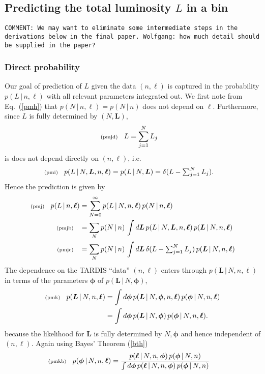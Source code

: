 \documentclass[11pt]{article}
\newcommand{\lleq}[1]{\label{#1} }
\renewcommand{\lleq}[1]{\label{#1} {\scriptstyle {\rm (#1)}} \hspace*{2ex} }
\newcommand{\cond}{\,|\,}
\newcommand{\bml}{{\bm{\ell}}}
\newcommand{\bmL}{{\bm{L}}}
\newcommand{\bmphi}{{\bm{\phi}}}
\begin{document}
\subsection{Predicting the total luminosity $L$ in a bin}

\texttt{COMMENT: We may want to eliminate some intermediate steps in
  the derivations below in the final paper. Wolfgang: how much detail
  should be supplied in the paper?}

\subsubsection{Direct probability}

Our goal of prediction of $L$ given the data $(n,\bml)$ is captured in
the probability $p(L\cond n,\bml)$ with all relevant parameters
integrated out. We first note from Eq.~(\ref{pmh}) that $p(N\cond
n,\bml) = p(N\cond n)$ does not depend on $\bml$. Furthermore, since
$L$ is fully determined by $(N,\bmL)$,
\begin{align}
  \lleq{pmjd}
  L &= \sum_{j=1}^N L_j
\end{align}
is does not depend directly on $(n,\bml)$, i.e.\
\begin{align}
  \lleq{pmi}
  p(L\cond N,\bmL,n,\bml)
  = p(L\cond N,\bmL)
  &= \delta(L - \textstyle\sum_{j=1}^N L_j).
\end{align}
Hence the prediction is given by
\begin{align}
  \lleq{pmj}
  p(L\cond n,\bml)
  &= \sum_{N=0}^\infty p(L\cond N,n,\bml)\,p(N\cond n,\bml) \\
  \lleq{pmjb}
  &= \sum_N p(N\cond n)\,\int d\bmL\, p(L\cond N,\bmL,n,\bml)\, p(\bmL\cond N,n,\bml)
  \\
  \lleq{pmjc}
  &= \sum_N p(N\cond n)\,\int d\bmL\,\delta(L - \textstyle\sum_{j=1}^N L_j)
  \, p(\bmL\cond N,n,\bml)
\end{align}
The dependence on the TARDIS ``data'' $(n,\bml)$ enters through
$p(\bmL\cond N,n,\bml)$ in terms of the parameters $\bmphi$ of
$p(\bmL\cond N,\bmphi)$,
\begin{align}
  \lleq{pmk}
  p(\bmL\cond N,n,\bml)
  &= \int d\bmphi\, p(\bmL\cond N,\bmphi,n,\bml)\,p(\bmphi\cond N,n,\bml) \\
  &= \int d\bmphi\, p(\bmL\cond N,\bmphi)\,p(\bmphi\cond N,n,\bml).
\end{align}
because the likelihood for $\bmL$ is fully determined by $N,\bmphi$
and hence independent of $(n,\bml)$.
%
Again using Bayes' Theorem (\ref{bth})
\begin{align}
  \lleq{pmkb}
  p(\bmphi\cond N,n,\bml) &=
  \frac{p(\bml\cond N,n,\bmphi)\,p(\bmphi\cond N,n)} %
  {\int d\bmphi\,p(\bml\cond N,n,\bmphi)\,p(\bmphi\cond N,n)} %
\end{align}
\end{document}
